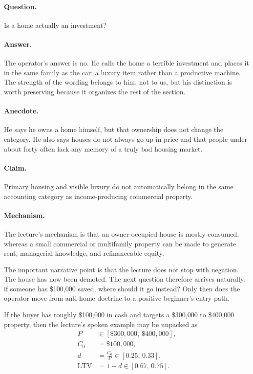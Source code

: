 \paragraph{Question.}
Is a home actually an investment?

\paragraph{Answer.}
The operator's answer is no. He calls the home a terrible investment and places it in the same family as the car: a luxury item rather than a productive machine. The strength of the wording belongs to him, not to us, but his distinction is worth preserving because it organizes the rest of the section.

\paragraph{Anecdote.}
He says he owns a home himself, but that ownership does not change the category. He also says houses do not always go up in price and that people under about forty often lack any memory of a truly bad housing market.

\paragraph{Claim.}
Primary housing and visible luxury do not automatically belong in the same accounting category as income-producing commercial property.

\paragraph{Mechanism.}
The lecture's mechanism is that an owner-occupied house is mostly consumed, whereas a small commercial or multifamily property can be made to generate rent, managerial knowledge, and refinanceable equity.

The important narrative point is that the lecture does not stop with negation. The house has now been demoted. The next question therefore arrives naturally: if someone has \$100{,}000 saved, where should it go instead? Only then does the operator move from anti-home doctrine to a positive beginner's entry path.

If the buyer has roughly \$100{,}000 in cash and targets a \$300{,}000 to \$400{,}000 property, then the lecture's spoken example may be unpacked as
\begin{align}
P &\in [\$300{,}000,\ \$400{,}000],\\
C_0 &= \$100{,}000,\\
d &= \frac{C_0}{P}\in [0.25,\,0.33],\\
\mathrm{LTV} &= 1-d \in [0.67,\,0.75].
\end{align}

